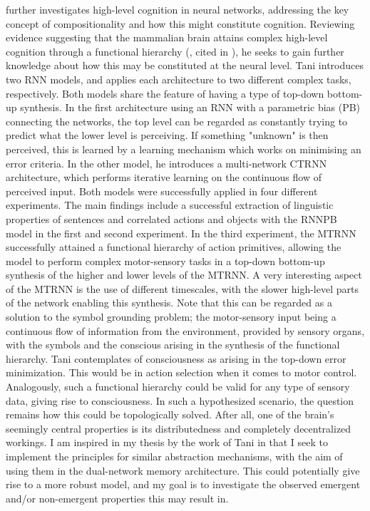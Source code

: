 \cite{Tani2014} further investigates high-level cognition in neural networks, addressing the key concept of compositionality and how this might constitute cognition. Reviewing evidence suggesting that the mammalian brain attains complex high-level cognition through a functional hierarchy (\cite{Miyake2000, Koechlin2003, Fuster2008}, cited in \cite{Tani2014}), he seeks to gain further knowledge about how this may be constituted at the neural level. Tani introduces two RNN models, and applies each architecture to two different complex tasks, respectively. Both models share the feature of having a type of top-down bottom-up synthesis. In the first architecture using an RNN with a parametric bias (PB) connecting the networks, the top level can be regarded as constantly trying to predict what the lower level is perceiving. If something "unknown" is then perceived, this is learned by a learning mechanism which works on minimising an error criteria. In the other model, he introduces a multi-network CTRNN architecture, which performs iterative learning on the continuous flow of perceived input. Both models were successfully applied in four different experiments. The main findings include a successful extraction of linguistic properties of sentences and correlated actions and objects with the RNNPB model in the first and second experiment. In the third experiment, the MTRNN successfully attained a functional hierarchy of action primitives, allowing the model to perform complex motor-sensory tasks in a top-down bottom-up synthesis of the higher and lower levels of the MTRNN. A very interesting aspect of the MTRNN is the use of different timescales, with the slower high-level parts of the network enabling this synthesis. Note that this can be regarded as a solution to the symbol grounding problem; the motor-sensory input being a continuous flow of information from the environment, provided by sensory organs, with the symbols and the conscious arising in the synthesis of the functional hierarchy. Tani contemplates of consciousness as arising in the top-down error minimization. This would be in action selection when it comes to motor control. Analogously, such a functional hierarchy could be valid for any type of sensory data, giving rise to consciousness. In such a hypothesized scenario, the question remains how this could be topologically solved. After all, one of the brain's seemingly central properties is its distributedness and completely decentralized workings. I am inspired in my thesis by the work of Tani in that I seek to implement the principles for similar abstraction mechanisms, with the aim of using them in the dual-network memory architecture. This could potentially give rise to a more robust model, and my goal is to investigate the observed emergent and/or non-emergent properties this may result in.

